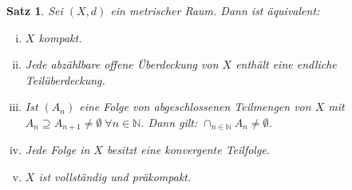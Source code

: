 \documentclass[ngerman]{report}
\theoremstyle{plain}%
\newtheorem{thm}{Satz}[chapter]
\theoremstyle{definition}%
\theoremstyle{myStyle}
\newcommand{\N}{\mathbb{N}}
\begin{document}
\begin{thm}
	Sei $(X,d)$ ein metrischer Raum. Dann ist äquivalent:
	\begin{enumerate}[(i)]
	\item $X$ kompakt.
	
	\item Jede abzählbare offene Überdeckung von $X$ enthält eine endliche Teilüberdeckung.
	
	\item Ist $(A_n)$ eine Folge von abgeschlossenen Teilmengen von $X$ mit $A_n \supseteq A_{n+1} \not = \emptyset\; \forall n\in\N$. Dann gilt: $\cap_{n\in\N}A_n \not = \emptyset$.
	
	\item Jede Folge in $X$ besitzt eine konvergente Teilfolge.
	
	\item $X$ ist vollständig und präkompakt.
	\end{enumerate}
\end{thm}
\end{document}
